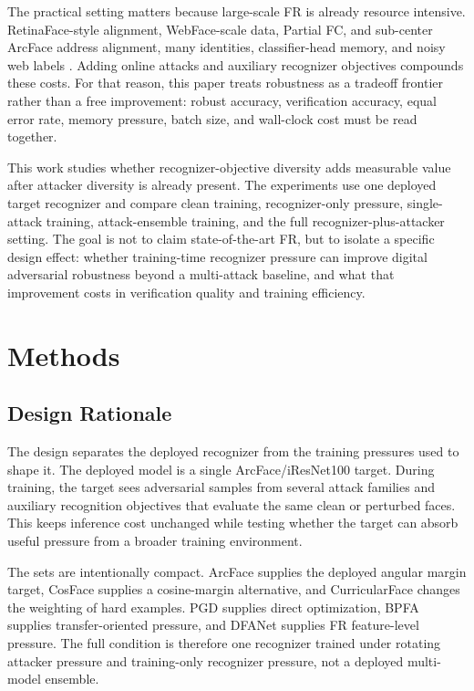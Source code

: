 \documentclass[conference]{IEEEtran}
\begin{document}
The practical setting matters because large-scale FR is already resource
intensive. RetinaFace-style alignment, WebFace-scale data, Partial FC, and
sub-center ArcFace address alignment, many identities, classifier-head memory,
and noisy web labels \cite{retinaface,webface260m,partialfc,subcenter}. Adding
online attacks and auxiliary recognizer objectives compounds these costs. For
that reason, this paper treats robustness as a tradeoff frontier rather than a
free improvement: robust accuracy, verification accuracy, equal error rate,
memory pressure, batch size, and wall-clock cost must be read together.

This work studies whether recognizer-objective diversity adds measurable value
after attacker diversity is already present. The experiments use one deployed
target recognizer and compare clean training, recognizer-only pressure,
single-attack training, attack-ensemble training, and the full
recognizer-plus-attacker setting. The goal is not to claim state-of-the-art FR,
but to isolate a specific design effect: whether training-time recognizer
pressure can improve digital adversarial robustness beyond a multi-attack
baseline, and what that improvement costs in verification quality and training
efficiency.

\section{Methods}
\subsection{Design Rationale}
The design separates the deployed recognizer from the training pressures used
to shape it. The deployed model is a single ArcFace/iResNet100 target. During
training, the target sees adversarial samples from several attack families and
auxiliary recognition objectives that evaluate the same clean or perturbed
faces. This keeps inference cost unchanged while testing whether the target can
absorb useful pressure from a broader training environment.

The sets are intentionally compact. ArcFace supplies the deployed angular
margin target, CosFace supplies a cosine-margin alternative, and CurricularFace
changes the weighting of hard examples. PGD supplies direct optimization,
BPFA supplies transfer-oriented pressure, and DFANet supplies FR feature-level
pressure. The full condition is therefore one recognizer trained under rotating
attacker pressure and training-only recognizer pressure, not a deployed
multi-model ensemble.
\end{document}
